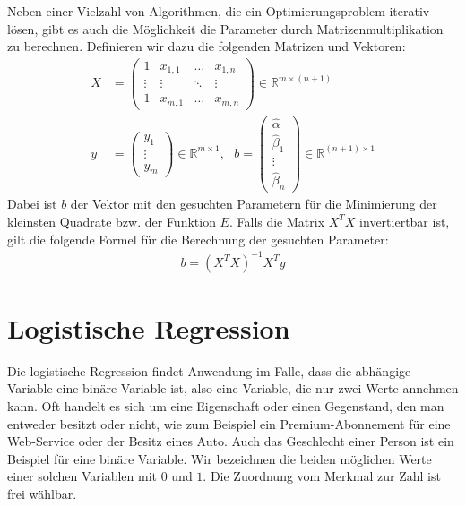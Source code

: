 Neben einer Vielzahl von Algorithmen, die ein Optimierungsproblem iterativ lösen, gibt es auch die Möglichkeit die Parameter durch Matrizenmultiplikation zu berechnen. Definieren wir dazu die folgenden Matrizen und Vektoren:
\begin{align*}
    X &= \begin{pmatrix}
        1 & x_{1, 1} & \dots & x_{1, n} \\
        \vdots & \vdots & \ddots & \vdots \\
        1 & x_{m, 1} & \dots & x_{m, n}
    \end{pmatrix} \in \mathbb{R}^{m \times (n + 1)} \\
    y &= \begin{pmatrix}
        y_1 \\
        \vdots \\
        y_m
    \end{pmatrix} \in \mathbb{R}^{m \times 1}, ~~~
    b = \begin{pmatrix}
        \hat\alpha \\
        \hat\beta_1 \\
        \vdots \\
        \hat\beta_n
    \end{pmatrix} \in \mathbb{R}^{(n + 1) \times 1}
\end{align*}
Dabei ist $b$ der Vektor mit den gesuchten Parametern für die Minimierung der kleinsten Quadrate bzw. der Funktion $E$. Falls die Matrix $X^T X$ invertiertbar ist, gilt die folgende Formel für die Berechnung der gesuchten Parameter:
\begin{align*}
    b = (X^T X)^{-1} X^T y
\end{align*}

\section{Logistische Regression}

Die logistische Regression findet Anwendung im Falle, dass die abhängige Variable eine binäre Variable ist, also eine Variable, die nur zwei Werte annehmen kann. Oft handelt es sich um eine Eigenschaft oder einen Gegenstand, den man entweder besitzt oder nicht, wie zum Beispiel ein Premium-Abonnement für eine Web-Service oder der Besitz eines Auto. Auch das Geschlecht einer Person ist ein Beispiel für eine binäre Variable. Wir bezeichnen die beiden möglichen Werte einer solchen Variablen mit $0$ und $1$. Die Zuordnung vom Merkmal zur Zahl ist frei wählbar.

